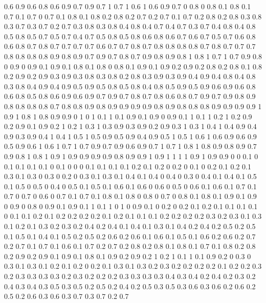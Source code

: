 0.6 0.9
0.6 0.8
0.6 0.9
0.7 0.9
0.7 1
0.7 1
0.6 1
0.6 0.9
0.7 0
0.8 0
0.8 0.1
0.8 0.1
0.7 0.1
0.7 0
0.7 0.1
0.8 0.1
0.8 0.2
0.8 0.2
0.7 0.2
0.7 0.1
0.7 0.2
0.8 0.2
0.8 0.3
0.8 0.3
0.7 0.3
0.7 0.2
0.7 0.3
0.8 0.3
0.8 0.4
0.8 0.4
0.7 0.4
0.7 0.3
0.7 0.4
0.8 0.4
0.8 0.5
0.8 0.5
0.7 0.5
0.7 0.4
0.7 0.5
0.8 0.5
0.8 0.6
0.8 0.6
0.7 0.6
0.7 0.5
0.7 0.6
0.8 0.6
0.8 0.7
0.8 0.7
0.7 0.7
0.7 0.6
0.7 0.7
0.8 0.7
0.8 0.8
0.8 0.8
0.7 0.8
0.7 0.7
0.7 0.8
0.8 0.8
0.8 0.9
0.8 0.9
0.7 0.9
0.7 0.8
0.7 0.9
0.8 0.9
0.8 1
0.8 1
0.7 1
0.7 0.9
0.8 0
0.9 0
0.9 0.1
0.9 0.1
0.8 0.1
0.8 0
0.8 0.1
0.9 0.1
0.9 0.2
0.9 0.2
0.8 0.2
0.8 0.1
0.8 0.2
0.9 0.2
0.9 0.3
0.9 0.3
0.8 0.3
0.8 0.2
0.8 0.3
0.9 0.3
0.9 0.4
0.9 0.4
0.8 0.4
0.8 0.3
0.8 0.4
0.9 0.4
0.9 0.5
0.9 0.5
0.8 0.5
0.8 0.4
0.8 0.5
0.9 0.5
0.9 0.6
0.9 0.6
0.8 0.6
0.8 0.5
0.8 0.6
0.9 0.6
0.9 0.7
0.9 0.7
0.8 0.7
0.8 0.6
0.8 0.7
0.9 0.7
0.9 0.8
0.9 0.8
0.8 0.8
0.8 0.7
0.8 0.8
0.9 0.8
0.9 0.9
0.9 0.9
0.8 0.9
0.8 0.8
0.8 0.9
0.9 0.9
0.9 1
0.9 1
0.8 1
0.8 0.9
0.9 0
1 0
1 0.1
1 0.1
0.9 0.1
0.9 0
0.9 0.1
1 0.1
1 0.2
1 0.2
0.9 0.2
0.9 0.1
0.9 0.2
1 0.2
1 0.3
1 0.3
0.9 0.3
0.9 0.2
0.9 0.3
1 0.3
1 0.4
1 0.4
0.9 0.4
0.9 0.3
0.9 0.4
1 0.4
1 0.5
1 0.5
0.9 0.5
0.9 0.4
0.9 0.5
1 0.5
1 0.6
1 0.6
0.9 0.6
0.9 0.5
0.9 0.6
1 0.6
1 0.7
1 0.7
0.9 0.7
0.9 0.6
0.9 0.7
1 0.7
1 0.8
1 0.8
0.9 0.8
0.9 0.7
0.9 0.8
1 0.8
1 0.9
1 0.9
0.9 0.9
0.9 0.8
0.9 0.9
1 0.9
1 1
1 1
0.9 1
0.9 0.9
0 0
0.1 0
0.1 0.1
0.1 0.1
0 0.1
0 0
0 0.1
0.1 0.1
0.1 0.2
0.1 0.2
0 0.2
0 0.1
0 0.2
0.1 0.2
0.1 0.3
0.1 0.3
0 0.3
0 0.2
0 0.3
0.1 0.3
0.1 0.4
0.1 0.4
0 0.4
0 0.3
0 0.4
0.1 0.4
0.1 0.5
0.1 0.5
0 0.5
0 0.4
0 0.5
0.1 0.5
0.1 0.6
0.1 0.6
0 0.6
0 0.5
0 0.6
0.1 0.6
0.1 0.7
0.1 0.7
0 0.7
0 0.6
0 0.7
0.1 0.7
0.1 0.8
0.1 0.8
0 0.8
0 0.7
0 0.8
0.1 0.8
0.1 0.9
0.1 0.9
0 0.9
0 0.8
0 0.9
0.1 0.9
0.1 1
0.1 1
0 1
0 0.9
0.1 0
0.2 0
0.2 0.1
0.2 0.1
0.1 0.1
0.1 0
0.1 0.1
0.2 0.1
0.2 0.2
0.2 0.2
0.1 0.2
0.1 0.1
0.1 0.2
0.2 0.2
0.2 0.3
0.2 0.3
0.1 0.3
0.1 0.2
0.1 0.3
0.2 0.3
0.2 0.4
0.2 0.4
0.1 0.4
0.1 0.3
0.1 0.4
0.2 0.4
0.2 0.5
0.2 0.5
0.1 0.5
0.1 0.4
0.1 0.5
0.2 0.5
0.2 0.6
0.2 0.6
0.1 0.6
0.1 0.5
0.1 0.6
0.2 0.6
0.2 0.7
0.2 0.7
0.1 0.7
0.1 0.6
0.1 0.7
0.2 0.7
0.2 0.8
0.2 0.8
0.1 0.8
0.1 0.7
0.1 0.8
0.2 0.8
0.2 0.9
0.2 0.9
0.1 0.9
0.1 0.8
0.1 0.9
0.2 0.9
0.2 1
0.2 1
0.1 1
0.1 0.9
0.2 0
0.3 0
0.3 0.1
0.3 0.1
0.2 0.1
0.2 0
0.2 0.1
0.3 0.1
0.3 0.2
0.3 0.2
0.2 0.2
0.2 0.1
0.2 0.2
0.3 0.2
0.3 0.3
0.3 0.3
0.2 0.3
0.2 0.2
0.2 0.3
0.3 0.3
0.3 0.4
0.3 0.4
0.2 0.4
0.2 0.3
0.2 0.4
0.3 0.4
0.3 0.5
0.3 0.5
0.2 0.5
0.2 0.4
0.2 0.5
0.3 0.5
0.3 0.6
0.3 0.6
0.2 0.6
0.2 0.5
0.2 0.6
0.3 0.6
0.3 0.7
0.3 0.7
0.2 0.7
